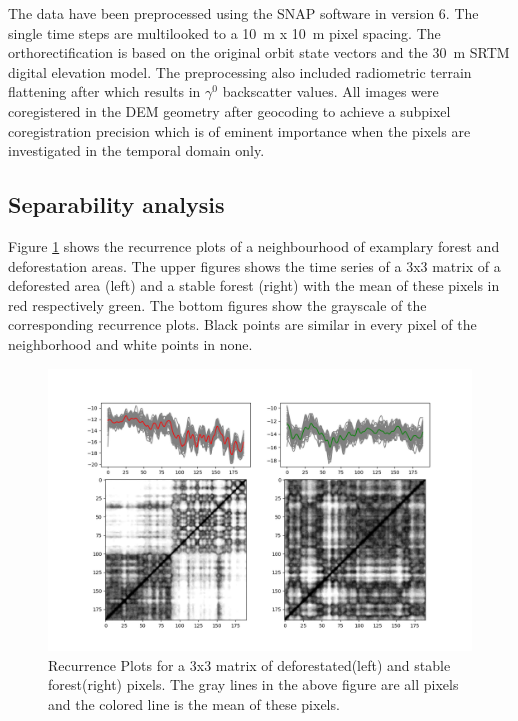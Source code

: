 \documentclass{article}
\begin{document}
The data have been preprocessed using the SNAP software \cite{SNAP} in version 6.
The single time steps are multilooked to a \SI{10}{\m} x \SI{10}{\m} pixel spacing.
The orthorectification is based on the original orbit state vectors and the \SI{30}{\m} SRTM digital elevation model\cite{SRTM}.
The preprocessing also included radiometric terrain flattening after \cite{Small} which results in $\gamma^0$ backscatter values.
All images were coregistered in the DEM geometry after geocoding to achieve a subpixel coregistration precision which is of eminent importance when the pixels are investigated in the temporal domain only.




\subsection{Separability analysis}

Figure \ref{rpforest} shows the recurrence plots of a neighbourhood of examplary forest and deforestation areas.
The upper figures shows the time series of a 3x3 matrix of a deforested area (left) and a stable forest (right) with the mean of these pixels in red respectively green.
The bottom figures show the grayscale of the corresponding recurrence plots.
Black points are similar in every pixel of the neighborhood and white points in none.


\begin{figure}
  \includegraphics[width=\textwidth]{figs/S1_Hidalgo_timestack_20km_VH___lin_20_test_tandemdem12_emd__rp_deffor_3.png}
  \caption{Recurrence Plots for a 3x3 matrix of deforestated(left) and stable forest(right) pixels.
           The gray lines in the above figure are all pixels and the colored line is the mean of these pixels.}
  \label{rpforest}
\end{figure}
\end{document}
